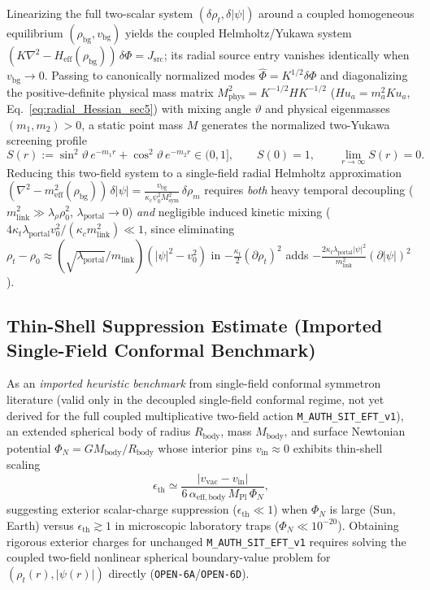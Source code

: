 Linearizing the full two-scalar system $(\delta\rho_t, \delta|\psi|)$ around a coupled homogeneous equilibrium $(\rho_{\mathrm{bg}}, v_{\mathrm{bg}})$ yields the coupled Helmholtz/Yukawa system $(K\nabla^2 - H_{\mathrm{eff}}(\rho_{\mathrm{bg}}))\,\delta\Phi = J_{\mathrm{src}}$; its radial source entry vanishes identically when $v_{\mathrm{bg}} \to 0$. Passing to canonically normalized modes $\hat{\Phi} = K^{1/2}\delta\Phi$ and diagonalizing the positive-definite physical mass matrix $M_{\mathrm{phys}}^2 = K^{-1/2} H K^{-1/2}$ ($H u_a = m_a^2 K u_a$, Eq.~\eqref{eq:radial_Hessian_sec5}) with mixing angle $\vartheta$ and physical eigenmasses $(m_1, m_2) > 0$, a static point mass $M$ generates the normalized two-Yukawa screening profile
\begin{equation}
S(r) := \sin^2\vartheta\,e^{-m_1 r} + \cos^2\vartheta\,e^{-m_2 r} \in (0, 1],
\qquad
S(0) = 1,
\qquad
\lim_{r\to\infty} S(r) = 0.
\label{eq:two_yukawa_S_profile}
\end{equation}
Reducing this two-field system to a single-field radial Helmholtz approximation $(\nabla^2 - m_{\mathrm{eff}}^2(\rho_{\mathrm{bg}}))\,\delta|\psi| = \frac{v_{\mathrm{bg}}}{\kappa_c\psi_0^2 M_{\mathrm{sym}}^2}\,\delta\rho_m$ requires \emph{both} heavy temporal decoupling ($m_{\mathrm{link}}^2 \gg \lambda_\rho\rho_0^2$, $\lambda_{\mathrm{portal}} \to 0$) \emph{and} negligible induced kinetic mixing ($4\kappa_t\lambda_{\mathrm{portal}} v_0^2 / (\kappa_c m_{\mathrm{link}}^2) \ll 1$, since eliminating $\rho_t - \rho_0 \approx (\sqrt{\lambda_{\mathrm{portal}}}/m_{\mathrm{link}})(|\psi|^2 - v_0^2)$ in $-\frac{\kappa_t}{2}(\partial\rho_t)^2$ adds $-\frac{2\kappa_t\lambda_{\mathrm{portal}}|\psi|^2}{m_{\mathrm{link}}^2}(\partial|\psi|)^2$).

\subsection{Thin-Shell Suppression Estimate (Imported Single-Field Conformal Benchmark)}

As an \emph{imported heuristic benchmark} from single-field conformal symmetron literature (valid only in the decoupled single-field conformal regime, not yet derived for the full coupled multiplicative two-field action \texttt{M\_AUTH\_SIT\_EFT\_v1}), an extended spherical body of radius $R_{\mathrm{body}}$, mass $M_{\mathrm{body}}$, and surface Newtonian potential $\Phi_N = G M_{\mathrm{body}} / R_{\mathrm{body}}$ whose interior pins $v_{\mathrm{in}} \approx 0$ exhibits thin-shell scaling
\begin{equation}
\epsilon_{\mathrm{th}} \simeq \frac{|v_{\mathrm{vac}} - v_{\mathrm{in}}|}{6\,\alpha_{\mathrm{eff,body}}\,M_{\mathrm{Pl}}\,\Phi_N},
\label{eq:thin_shell_factor}
\end{equation}
suggesting exterior scalar-charge suppression ($\epsilon_{\mathrm{th}} \ll 1$) when $\Phi_N$ is large (Sun, Earth) versus $\epsilon_{\mathrm{th}} \gtrsim 1$ in microscopic laboratory traps ($\Phi_N \ll 10^{-20}$). Obtaining rigorous exterior charges for unchanged \texttt{M\_AUTH\_SIT\_EFT\_v1} requires solving the coupled two-field nonlinear spherical boundary-value problem for $(\rho_t(r), |\psi(r)|)$ directly (\texttt{OPEN-6A}/\texttt{OPEN-6D}).

